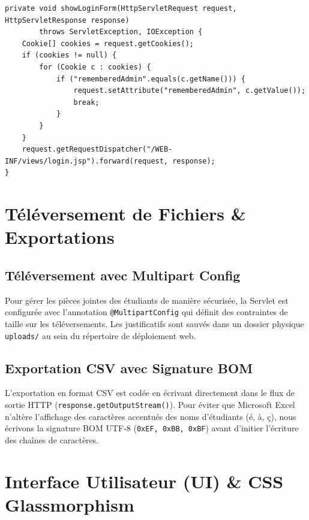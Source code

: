 \documentclass[12pt,a4paper]{article}
\begin{document}
\begin{lstlisting}[caption={Lecture des cookies au chargement du login - AbsenceServlet.java}]
private void showLoginForm(HttpServletRequest request, HttpServletResponse response)
        throws ServletException, IOException {
    Cookie[] cookies = request.getCookies();
    if (cookies != null) {
        for (Cookie c : cookies) {
            if ("rememberedAdmin".equals(c.getName())) {
                request.setAttribute("rememberedAdmin", c.getValue());
                break;
            }
        }
    }
    request.getRequestDispatcher("/WEB-INF/views/login.jsp").forward(request, response);
}
\end{lstlisting}

\section{Téléversement de Fichiers \& Exportations}

\subsection{Téléversement avec Multipart Config}
Pour gérer les pièces jointes des étudiants de manière sécurisée, la Servlet est configurée avec l'annotation \texttt{@MultipartConfig} qui définit des contraintes de taille sur les téléversements. Les justificatifs sont sauvés dans un dossier physique \texttt{uploads/} au sein du répertoire de déploiement web.

\subsection{Exportation CSV avec Signature BOM}
L'exportation en format CSV est codée en écrivant directement dans le flux de sortie HTTP (\texttt{response.getOutputStream()}).
Pour éviter que Microsoft Excel n'altère l'affichage des caractères accentués des noms d'étudiants (é, à, ç), nous écrivons la signature BOM UTF-8 (\texttt{0xEF, 0xBB, 0xBF}) avant d'initier l'écriture des chaînes de caractères.

\section{Interface Utilisateur (UI) \& CSS Glassmorphism}
\end{document}
